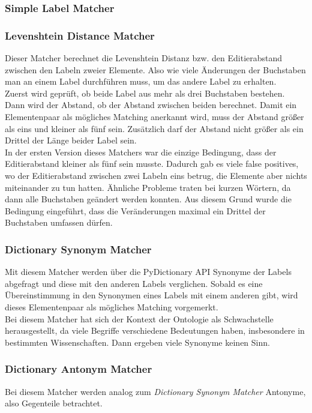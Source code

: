 		\subsubsection{Simple Label Matcher}
		
		\subsubsection{Levenshtein Distance Matcher}
		Dieser Matcher berechnet die Levenshtein Distanz bzw. den Editierabstand
		zwischen den Labeln zweier Elemente. Also wie viele Änderungen der Buchstaben
		man an einem Label durchführen muss, um das andere Label zu erhalten.\\
		Zuerst wird geprüft, ob beide Label aus mehr als drei Buchstaben bestehen.
		Dann wird der Abstand, ob der Abstand zwischen beiden berechnet. Damit ein
		Elementenpaar als mögliches Matching anerkannt wird, muss der Abstand größer
		als eins und kleiner als fünf sein. Zusätzlich darf der Abstand nicht größer
		als ein Drittel der Länge beider Label sein.\\
		In der ersten Version dieses Matchers war die einzige Bedingung, dass der
		Editierabstand kleiner als fünf sein musste. Dadurch gab es viele false
		positives, wo der Editierabstand zwischen zwei Labeln eins betrug, die
		Elemente aber nichts miteinander zu tun hatten.	Ähnliche Probleme traten bei
		kurzen Wörtern, da dann alle Buchstaben geändert werden konnten. Aus diesem
		Grund wurde die Bedingung eingeführt, dass die Veränderungen maximal ein
		Drittel der Buchstaben umfassen dürfen.
		
		\subsubsection{Dictionary Synonym Matcher}
		Mit diesem Matcher werden über die PyDictionary API Synonyme der Labels
		abgefragt und diese mit den anderen Labels verglichen. Sobald es eine
		Übereinstimmung in den Synonymen eines Labels mit einem anderen gibt, wird
		dieses Elementenpaar als mögliches Matching vorgemerkt.\\
		Bei diesem Matcher hat sich der Kontext der Ontologie als Schwachstelle
		herausgestellt, da viele Begriffe verschiedene Bedeutungen haben, insbesondere
		in bestimmten Wissenschaften. Dann ergeben viele Synonyme keinen Sinn.
		
		\subsubsection{Dictionary Antonym Matcher}
		Bei diesem Matcher werden analog zum \textit{Dictionary Synonym Matcher}
		Antonyme, also Gegenteile betrachtet.
		
